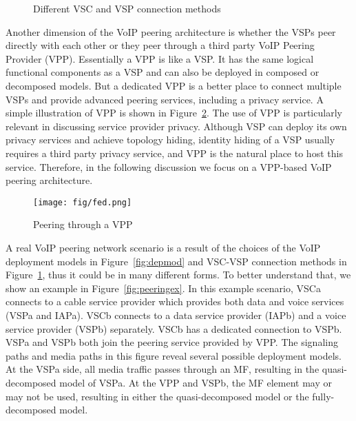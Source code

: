 \documentclass[letterpaper,notitlepage,times,12pt]{article}
\begin{document}
\begin{figure}[!hp]
\begin{center}
\end{center}
\caption{Different VSC and VSP connection methods}\label{fig:vscp}
\end{figure}




Another dimension of the VoIP peering architecture is whether the VSPs peer directly with each other or they peer through a third party VoIP Peering Provider (VPP). Essentially a VPP is like a VSP. It has the same logical functional components as a VSP and can also be deployed in composed or decomposed models. But a dedicated VPP is a better place to connect multiple VSPs and provide advanced peering services, including a privacy service. A simple illustration of VPP is shown in Figure~\ref{fig:fed}. The use of VPP is particularly relevant in discussing service provider privacy. Although VSP can deploy its own privacy services and achieve topology hiding, identity hiding of a VSP usually requires a third party privacy service, and VPP is the natural place to host this service. Therefore, in the following discussion we focus on a VPP-based VoIP peering architecture. 

\begin{figure}[!tph]
\centerline{
    \texttt{[image: fig/fed.png]}
}
\caption{Peering through a VPP}\label{fig:fed}
\end{figure}





A real VoIP peering network scenario is a result of the choices of the VoIP deployment models in Figure~\ref{fig:depmod} and VSC-VSP connection methods in Figure~\ref{fig:vscp}, thus it could be in many different forms. To better understand that, we show an example in Figure~\ref{fig:peeringex}. In this example scenario, VSCa connects to a cable service provider which provides both data and voice services (VSPa and IAPa). VSCb connects to a data service provider (IAPb) and a voice service provider (VSPb) separately. VSCb has a dedicated connection to VSPb. VSPa and VSPb both join the peering service provided by VPP. The signaling paths and media paths in this figure reveal several possible deployment models. At the VSPa side, all media traffic passes through an MF, resulting in the quasi-decomposed model of VSPa. At the VPP and VSPb, the MF element may or may not be used, resulting in either the quasi-decomposed model or the fully-decomposed model.
\end{document}
